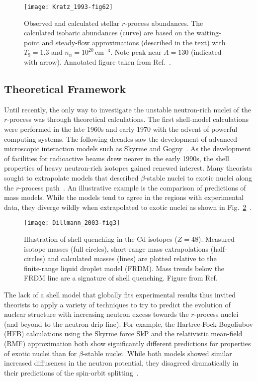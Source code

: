 \begin{figure}%
\centering
\texttt{[image: Kratz\_1993-fig62]}%
\caption[Observed and calculated stellar $r$-process abundances]{Observed and calculated stellar $r$-process abundances.  The calculated isobaric abundances (curve) are based on the waiting-point and steady-flow approximations (described in the text) with $T_9=1.3$ and $n_n=10^{20}$\,cm$^{-3}$. Note peak near $A=130$ (indicated with arrow).  Annotated figure taken from Ref.~\cite[Fig.~6(a)]{Kratz_1993}.}%
\label{abun}%
\end{figure}

\subsection{Theoretical Framework}
Until recently, the only way to investigate the unstable neutron-rich nuclei of the $r$-process was through theoretical calculations.  The first shell-model calculations were performed in the late 1960s and early 1970 with the advent of powerful computing systems.  The following decades saw the development of advanced microscopic interaction models such as Skyrme and Gogny~\cite{Caurier_2005}.  As the development of facilities for radioactive beams drew nearer in the early 1990s, the shell properties of heavy neutron-rich isotopes gained renewed interest.  Many theorists sought to extrapolate models that described $\beta$-stable nuclei to exotic nuclei along the $r$-process path~\cite{Sharma_2002}.  An illustrative example is the comparison of predictions of mass models.  While the models tend to agree in the regions with experimental data, they diverge wildly when extrapolated to exotic nuclei as shown in Fig.~\ref{quench}~\cite{Dillmann_2003}.

\begin{figure}%
\centering
\texttt{[image: Dillmann\_2003-fig3]}%
\caption[Illustration of shell quenching in the Cd isotopes ($Z=48$)]{Illustration of shell quenching in the Cd isotopes ($Z=48$).  Measured isotope masses (full circles), short-range mass extrapolations (half-circles) and calculated masses (lines) are plotted relative to the finite-range liquid droplet model (FRDM).  Mass trends below the FRDM line are a signature of shell quenching.  Figure from Ref.~\cite[Fig.~3]{Dillmann_2003}}%
\label{quench}%
\end{figure}

The lack of a shell model that globally fits experimental results thus invited theorists to apply a variety of techniques to try to predict the evolution of nuclear structure with increasing neutron excess towards  the $r$-process nuclei (and beyond to the neutron drip line).  For example, the Hartree-Fock-Bogoliubov (HFB) calculations using the Skyrme force SkP and the relativistic mean-field (RMF) approximation both show significantly different predictions for properties of exotic nuclei than for $\beta$-stable nuclei.  While both models showed similar increased diffuseness in the neutron potential, they disagreed dramatically in their predictions of the spin-orbit splitting~\cite{Dobaczewski_1994}.

